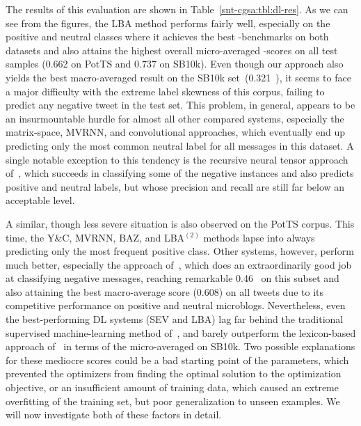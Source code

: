 The results of this evaluation are shown in
Table~\ref{snt-cgsa:tbl:dl-res}.  As we can see from the figures, the
LBA method performs fairly well, especially on the positive and
neutral classes where it achieves the best \F-benchmarks on both
datasets and also attains the highest overall micro-averaged \F-scores
on all test samples (0.662 on PotTS and 0.737 on SB10k).  Even though
our approach also yields the best macro-averaged result on the SB10k
set~(0.321~\F), it seems to face a major difficulty with the extreme
label skewness of this corpus, failing to predict any negative tweet
in the test set.  This problem, in general, appears to be an
insurmountable hurdle for almost all other compared systems,
especially the matrix-space, MVRNN, and convolutional approaches,
which eventually end up predicting only the most common neutral label
for all messages in this dataset.  A single notable exception to this
tendency is the recursive neural tensor approach of~\citet{Socher:13},
which succeeds in classifying some of the negative instances and also
predicts positive and neutral labels, but whose precision and recall
are still far below an acceptable level.

A similar, though less severe situation is also observed on the PotTS
corpus.  This time, the Y\&C, MVRNN, BAZ, and LBA$^{(2)}$ methods
lapse into always predicting only the most frequent positive class.
Other systems, however, perform much better, especially the approach
of~\citet{Severyn:15}, which does an extraordinarily good job at
classifying negative messages, reaching remarkable 0.46~\F{} on this
subset and also attaining the best macro-average score (0.608) on all
tweets due to its competitive performance on positive and neutral
microblogs.  Nevertheless, even the best-performing DL systems (SEV
and LBA) lag far behind the traditional supervised machine-learning
method of~\citet{Mohammad:13}, and barely outperform the lexicon-based
approach of~\citet{Hu:04} in terms of the micro-averaged \F{} on
SB10k.  Two possible explanations for these mediocre scores could be a
bad starting point of the parameters, which prevented the optimizers
from finding the optimal solution to the optimization objective, or an
insufficient amount of training data, which caused an extreme
overfitting of the training set, but poor generalization to unseen
examples.  We will now investigate both of these factors in detail.



